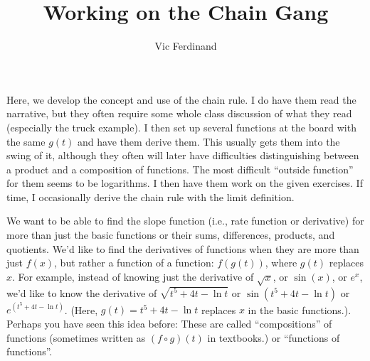 \documentclass{ximera}
\author{Vic Ferdinand}
\title{Working on the Chain Gang}
\begin{document}
\begin{abstract}
\end{abstract}
\maketitle


\begin{instructorIntro}
Here, we develop the concept and use of the chain rule.  I do have them read the narrative, but they often require some whole class discussion of what they read (especially the truck example).  I then set up several functions at the board with the same $g(t)$ and have them derive them. This usually gets them into the swing of it, although they often will later have difficulties distinguishing between a product and a composition of functions.  The most difficult ``outside function'' for them seems to be logarithms. I then have them work on the given exercises. If time, I occasionally derive the chain rule with the limit definition.  
\end{instructorIntro}


We want to be able to find the slope function (i.e., rate function or derivative) for more than just the basic functions or their sums, differences, products, and quotients.  We'd like to find the derivatives of functions when they are more than just $f(x)$, but rather a function of a function:  $f(g(t))$, where $g(t)$ replaces $x$.  For example, instead of knowing just the derivative of   $\sqrt{x}$, or  $\sin(x)$,  or  $e^x$, we'd like to know the derivative of  $\sqrt{t^5+4t-\ln t}$ or $\sin(t^5+4t-\ln t)$ or   $e^{(t^5+4t-\ln t)}$.  (Here, $g(t) = t^5 + 4t-\ln t$  replaces $x$ in the basic functions.).  Perhaps you have seen this idea before:  These are called ``compositions'' of functions (sometimes written as $(f \circ g)(t)$ in textbooks.) or ``functions of functions''.
\end{document}
